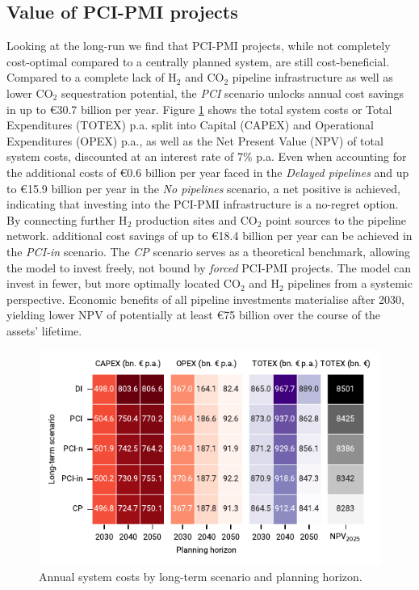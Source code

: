 \documentclass[pdflatex,sn-nature]{sn-jnl}%
\theoremstyle{thmstyleone}%
\theoremstyle{thmstyletwo}%
\theoremstyle{thmstylethree}%
\begin{document}
\subsection{Value of PCI-PMI projects}\label{sec:value_of_pcipmi_projects}
Looking at the long-run we find that PCI-PMI projects, while not completely cost-optimal compared to a centrally planned system, are still cost-beneficial. Compared to a complete lack of H$_2$ and CO$_2$ pipeline infrastructure as well as lower CO$_2$ sequestration potential, the \textit{PCI} scenario unlocks annual cost savings in up to €30.7 billion per year. Figure \ref{fig:totex_heatmap} shows the total system costs or Total Expenditures (TOTEX) p.a. split into Capital (CAPEX) and Operational Expenditures (OPEX) p.a., as well as the Net Present Value (NPV) of total system costs, discounted at an interest rate of 7\% p.a.
Even when accounting for the additional costs of €0.6 billion per year faced in the \textit{Delayed pipelines} and up to €15.9 billion per year in the \textit{No pipelines} scenario, a net positive is achieved, indicating that investing into the PCI-PMI infrastructure is a no-regret option. By connecting further H$_2$ production sites and CO$_2$ point sources to the pipeline network. additional cost savings of up to €18.4 billion per year can be achieved in the \textit{PCI-in} scenario. The \textit{CP} scenario serves as a theoretical benchmark, allowing the model to invest freely, not bound by \textit{forced} PCI-PMI projects. The model can invest in fewer, but more optimally located CO$_2$ and H$_2$ pipelines from a systemic perspective. Economic benefits of all pipeline investments materialise after 2030, yielding lower NPV of potentially at least €75 billion over the course of the assets' lifetime. 

\begin{figure}[t]
  \centering
  \includegraphics{figures/totex_heatmap}
  \caption{Annual system costs by long-term scenario and planning horizon.}
  \label{fig:totex_heatmap}
\end{figure}
\end{document}
